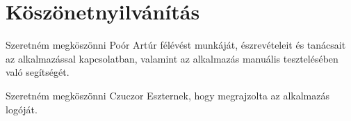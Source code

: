 \chapter{Köszönetnyilvánítás} %
\label{ch:acknowledgments}
Szeretném megköszönni Poór Artúr félévést munkáját, észrevételeit és tanácsait az alkalmazással kapcsolatban, valamint az alkalmazás manuális tesztelésében való segítségét.

Szeretném megköszönni Czuczor Eszternek, hogy megrajzolta az alkalmazás logóját.